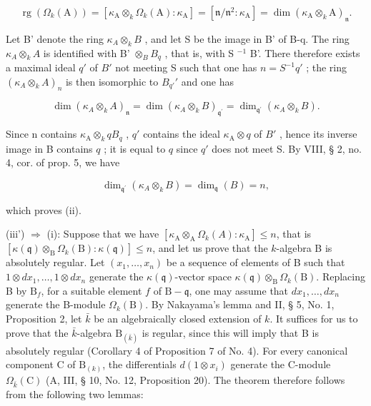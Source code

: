 \[
\operatorname{rg} \left(\Omega_ {k} (\mathrm{A})\right) = \left[ \kappa_ {\mathrm{A}} \otimes_ {k} \Omega_ {k} (\mathrm{A}): \kappa_ {\mathrm{A}} \right] = \left[ \mathfrak {n} / \mathfrak {n} ^ {2}: \kappa_ {\mathrm{A}} \right] = \dim \left(\kappa_ {\mathrm{A}} \otimes_ {k} \mathrm{A}\right) _ {\mathfrak {n}}.
\]

Let B' denote the ring \(\kappa_{A}\otimes_{k}B\) , and let S be the image in B' of B-q. The ring \(\kappa_{A}\otimes_{k}A\) is identified with B' \(\otimes_{B}B_{q}\) , that is, with S \(^{-1}\) B'. There therefore exists a maximal ideal \(q'\) of \(B'\) not meeting S such that one has \(n = S^{-1}q'\) ; the ring \((\kappa_A \otimes_k A)_n\) is then isomorphic to \(B_{q'}'\) and one has

\[
\dim (\kappa_ {A} \otimes_ {k} A) _ {\mathfrak {n}} = \dim (\kappa_ {A} \otimes_ {k} B) _ {\mathfrak {q} ^ {\prime}} = \dim_ {\mathfrak {q} ^ {\prime}} (\kappa_ {A} \otimes_ {k} B).
\]

Since n contains \(\kappa_{\mathrm{A}} \otimes_{k} qB_{q}\) , \(q'\) contains the ideal \(\kappa_{\mathrm{A}} \otimes q\) of \(B'\) , hence its inverse image in B contains \(q\) ; it is equal to \(q\) since \(q'\) does not meet S. By VIII, § 2, no. 4, cor. of prop. 5, we have

\[
\dim_ {\mathfrak {q} ^ {\prime}} \left(\kappa_ {A} \otimes_ {k} B\right) = \dim_ {\mathfrak {q}} (B) = n,
\]

which proves (ii).

(iii') \(\Rightarrow\) (i): Suppose that we have \([\kappa_{\mathrm{A}}\otimes_{\mathrm{A}}\Omega_{k}(A):\kappa_{\mathrm{A}}]\leqslant n\), that is \([\kappa (\mathfrak{q})\otimes_{\mathrm{B}}\Omega_{k}(\mathrm{B}):\kappa (\mathfrak{q})]\leqslant n\), and let us prove that the \(k\)-algebra B is absolutely regular. Let \((x_{1},\ldots ,x_{n})\) be a sequence of elements of B such that \(1\otimes dx_1,\dots ,1\otimes dx_n\) generate the \(\kappa (\mathfrak{q})\)-vector space \(\kappa (\mathfrak{q})\otimes_{\mathrm{B}}\Omega_{k}(\mathrm{B})\). Replacing B by \(\mathrm{B}_f\), for a suitable element \(f\) of \(\mathrm{B} - \mathfrak{q}\), one may assume that \(dx_{1},\ldots ,dx_{n}\) generate the B-module \(\Omega_k(\mathrm{B})\). By Nakayama's lemma and II, § 5, No. 1, Proposition 2, let \(\bar{k}\) be an algebraically closed extension of \(k\). It suffices for us to prove that the \(\bar{k}\)-algebra \(\mathrm{B}_{(\bar{k})}\) is regular, since this will imply that B is absolutely regular (Corollary 4 of Proposition 7 of No. 4). For every canonical component C of \(\mathrm{B}_{(k)}\), the differentials \(d(1\otimes x_i)\) generate the C-module \(\Omega_{\bar{k}}(\mathrm{C})\) (A, III, § 10, No. 12, Proposition 20). The theorem therefore follows from the following two lemmas:

